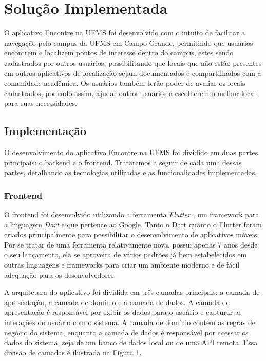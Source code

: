 \section{Solução Implementada}
\label{sec:implementacao}

    O aplicativo Encontre na UFMS foi desenvolvido com o intuito de facilitar a navegação pelo campus da UFMS em Campo Grande, permitindo que usuários encontrem e localizem pontos de interesse dentro do campus, estes sendo cadastrados por outros usuários, possibilitando que locais que não estão presentes em outros aplicativos de localização sejam documentados e compartilhados com a comunidade acadêmica. Os usuários também terão poder de avaliar os locais cadastrados, podendo assim, ajudar outros usuários a escolherem o melhor local para suas necessidades.

\subsection{Implementação}

    O desenvolvimento do aplicativo Encontre na UFMS foi dividido em duas partes principais: o backend e o frontend. Trataremos a seguir de cada uma dessas partes, detalhando as tecnologias utilizadas e as funcionalidades implementadas.

\subsubsection{Frontend}

    O frontend foi desenvolvido utilizando a ferramenta \textit{Flutter} \cite{flutter}, um framework para a linguagem \textit{Dart} \cite{dart} e que pertence ao Google. Tanto o Dart quanto o Flutter foram criados principalmente para possibilitar o desenvolvimento de aplicativos móveis. Por se tratar de uma ferramenta relativamente nova, possui apenas 7 anos desde o seu lançamento, ela se aproveita de vários padrões já bem estabelecidos em outras linguagens e frameworks para criar um ambiente moderno e de fácil adequação para os desenvolvedores.

    A arquitetura do aplicativo foi dividida em três camadas principais: a camada de apresentação, a camada de domínio e a camada de dados. A camada de apresentação é responsável por exibir os dados para o usuário e capturar as interações do usuário com o sistema. A camada de domínio contém as regras de negócio do sistema, enquanto a camada de dados é responsável por acessar os dados do sistema, seja de um banco de dados local ou de uma API remota. Essa divisão de camadas é ilustrada na Figura 1.


